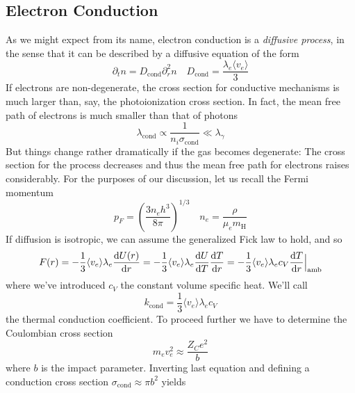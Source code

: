 \subsection{Electron Conduction}
As we might expect from its name, electron conduction is a \emph{diffusive process}, in the sense that it can be described by a diffusive equation of the form 
\begin{equation*}
	\partial_{t}n = D_{\text{cond}}\partial_{r}^{2}n \quad D_{\text{cond}} = \frac{\lambda_{e}\langle v_{e} \rangle}{3}
\end{equation*}
If electrons are non-degenerate, the cross section for conductive mechanisms is much larger than, say, the photoionization cross section. In fact, the mean free path of electrons is much smaller than that of photons
\begin{equation*}
	\lambda_{\text{cond}} \propto \frac{1}{n_{i}\sigma_{\text{cond}}} \ll \lambda_{\gamma}
\end{equation*}
But things change rather dramatically if the gas becomes degenerate: The cross section for the process decreases and thus the mean free path for electrons raises considerably. For the purposes of our discussion, let us recall the Fermi momentum 
\begin{equation}
	p_{F} = \left(\frac{3n_{e}h^{3}}{8\pi}\right)^{1/3} \quad n_{e} = \frac{\rho}{\mu_{e}m_{\text{H}}}
	\label{eq:fermimomentum}
\end{equation}
If diffusion is isotropic, we can assume the generalized Fick law to hold, and so 
\begin{equation}
	F(r) = -\frac{1}{3}\langle v_{e} \rangle \lambda_{e}\frac{\text{d}U(r)}{\text{d}r} = -\frac{1}{3}\langle v_{e} \rangle \lambda_{e}\frac{\text{d}U}{\text{d}T}\frac{\text{d}T}{\text{d}r} = -\frac{1}{3}\langle v_{e} \rangle \lambda_{e}c_{V}\frac{\text{d}T}{\text{d}r}\Big|_{\text{amb}}
	\label{eq:generalizedfick}
\end{equation}
where we've introduced $c_{V}$ the constant volume specific heat. We'll call
\begin{equation}
	k_{\text{cond}} = \frac{1}{3}\langle v_{e} \rangle \lambda_{e}c_{V}
	\label{eq:thermalconductioncoefficient}
\end{equation}
the thermal conduction coefficient. To proceed further we have to determine the Coulombian cross section
\begin{equation*}
	m_{e}v_{e}^{2}\approx \frac{Z_{C}e^{2}}{b}
\end{equation*}
where $b$ is the impact parameter. Inverting last equation and defining a conduction cross section $\sigma_{\text{cond}} \approx \pi b^{2}$ yields
